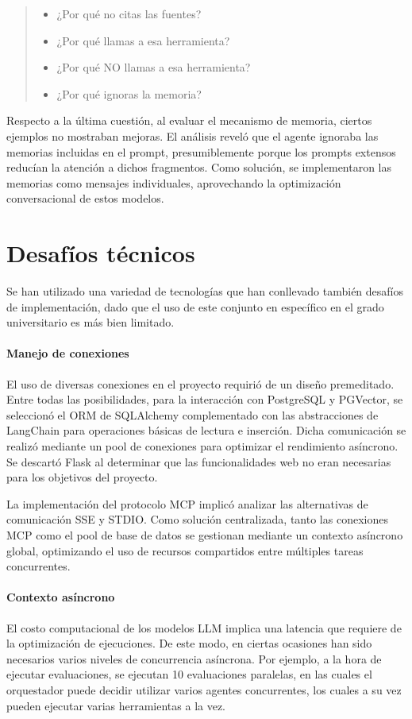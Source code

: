 \begin{quote}
\begin{itemize}
    \item ¿Por qué no citas las fuentes? 
    \item ¿Por qué llamas a esa herramienta?
    \item ¿Por qué NO llamas a esa herramienta?
    \item ¿Por qué ignoras la memoria?
\end{itemize}
\end{quote}

Respecto a la última cuestión, al evaluar el mecanismo de memoria, ciertos ejemplos no mostraban mejoras. El análisis reveló que el agente ignoraba las memorias incluidas en el prompt, presumiblemente porque los prompts extensos reducían la atención a dichos fragmentos. Como solución, se implementaron las memorias como mensajes individuales, aprovechando la optimización conversacional de estos modelos.

\section{Desafíos técnicos}
Se han utilizado una variedad de tecnologías que han conllevado también desafíos de implementación, dado que el uso de este conjunto en específico en el grado universitario es más bien limitado.

\paragraph{Manejo de conexiones}
El uso de diversas conexiones en el proyecto requirió de un diseño premeditado. Entre todas las posibilidades, para la interacción con PostgreSQL y PGVector, se seleccionó el ORM de SQLAlchemy complementado con las abstracciones de LangChain para operaciones básicas de lectura e inserción. Dicha comunicación se realizó mediante un pool de conexiones para optimizar el rendimiento asíncrono. Se descartó Flask al determinar que las funcionalidades web no eran necesarias para los objetivos del proyecto.

La implementación del protocolo MCP implicó analizar las alternativas de comunicación SSE y STDIO. Como solución centralizada, tanto las conexiones MCP como el pool de base de datos se gestionan mediante un contexto asíncrono global, optimizando el uso de recursos compartidos entre múltiples tareas concurrentes.

\paragraph{Contexto asíncrono}
El costo computacional de los modelos LLM implica una latencia que requiere de la optimización de ejecuciones. De este modo, en ciertas ocasiones han sido necesarios varios niveles de concurrencia asíncrona. Por ejemplo, a la hora de ejecutar evaluaciones, se ejecutan 10 evaluaciones paralelas, en las cuales el orquestador puede decidir utilizar varios agentes concurrentes, los cuales a su vez pueden ejecutar varias herramientas a la vez. 

